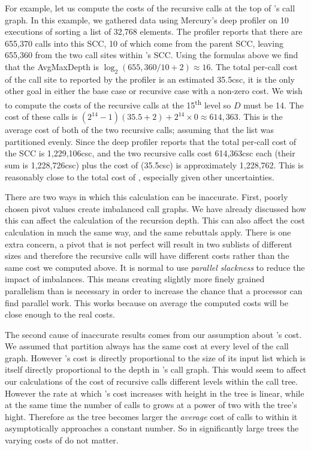 For example, let us compute the costs of the recursive calls at the top of
\quicksortacc's call graph.
In this example, we gathered data using Mercury's deep profiler on 10
executions of \quicksortacc sorting a list of 32,768 elements.
The profiler reports that there are 655,370 calls into this SCC,
10 of which come from the parent SCC, leaving 655,360 from the two call sites
within \quicksortacc's SCC.
Using the formulas above we find that the AvgMaxDepth is
$\log_{2}(655,360/10 + 2) \approx 16$.
The total per-call cost of the call site to \partition reported by the profiler
is an estimated 35.5csc,
it is the only other goal in either the base case or recursive case with a
non-zero cost.
We wish to compute the costs of the recursive calls at the
15\textsuperscript{th} level so $D$ must be 14.
The cost of these calls is
$(2^{14} - 1)(35.5 + 2) + 2^{14}\times0 \approx 614,363$.
This is the average cost of both of the two recursive calls;
assuming that the list was partitioned evenly.
Since the deep profiler reports that the total per-call cost of the
\quicksortacc SCC is 1,229,106csc, 
and the two recursive calls cost 614,363csc each (their sum is 1,228,726csc)
plus the cost of \partition (35.5csc) is approximately 1,228,762.
This is reasonably close to the total cost of \quicksortacc,
especially given other uncertainties.

There are two ways in which this calculation can be inaccurate.
First, poorly chosen pivot values create imbalanced call graphs.
We have already discussed how this can affect the calculation of the
recursion depth.
This can also affect the cost calculation in much the same way,
and the same rebuttals apply.
There is one extra concern,
a pivot that is not perfect will result in two sublists of different sizes
and therefore the recursive calls will have different costs rather than the
same cost we computed above.
It is normal to use \emph{parallel slackness} to reduce the impact of
imbalances.
This means creating slightly more finely grained parallelism than is
necessary in order to increase the chance that a processor can find parallel
work.
This works because on average the computed costs will be close enough to the
real costs.

The second cause of inaccurate results comes from our assumption about
\partition's cost.
We assumed that partition always has the same cost at every level of
the call graph.
However \partition's cost is directly proportional to the size of its input
list which is itself directly proportional to the depth in \quicksortacc's call
graph.
This would seem to affect our calculations of the cost of recursive calls
different levels within the call tree.
However the rate at which \partition's cost increases with height in the tree
is linear, while at the same time the number of calls to \partition grows at
a power of two with the tree's hight.
Therefore as the tree becomes larger the \emph{average} cost of calls to
\partition within it asymptotically approaches a constant number.
So in significantly large trees the varying costs of \partition do not
matter.

